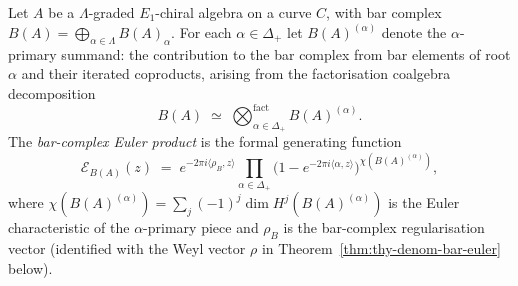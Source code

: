 \begin{definition}
\label{def:thy-denom-bar-euler-product}
Let $A$ be a $\Lambda$-graded $E_1$-chiral algebra on a curve $C$, with bar complex
$B(A) = \bigoplus_{\alpha \in \Lambda} B(A)_\alpha$. For each $\alpha \in \Delta_+$
let $B(A)^{(\alpha)}$ denote the $\alpha$-primary summand: the contribution to the bar
complex from bar elements of root $\alpha$ and their iterated coproducts, arising from the factorisation coalgebra decomposition
\[
 B(A) \;\simeq\; \bigotimes_{\alpha \in \Delta_+}^{\mathrm{fact}} B(A)^{(\alpha)}.
\]
The \emph{bar-complex Euler product} is the formal generating function
\begin{equation}
\label{eq:thy-bar-euler-product}
 \mathcal{E}_{B(A)}(z)
 \;=\;
 e^{-2\pi i\langle \rho_B, z\rangle}
 \prod_{\alpha \in \Delta_+}
 \bigl(1 - e^{-2\pi i\langle \alpha, z\rangle}\bigr)^{\chi(B(A)^{(\alpha)})},
\end{equation}
where $\chi(B(A)^{(\alpha)}) = \sum_j (-1)^j \dim H^j(B(A)^{(\alpha)})$ is the Euler
characteristic of the $\alpha$-primary piece and $\rho_B$ is the bar-complex regularisation vector
(identified with the Weyl vector $\rho$ in Theorem~\ref{thm:thy-denom-bar-euler} below).
\end{definition}

